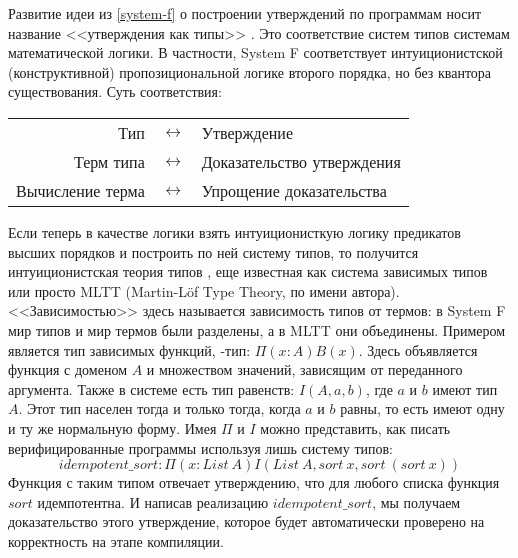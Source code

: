 Развитие идеи из \ref{system-f} о построении утверждений по программам носит
название <<утверждения как типы>> \cite{propositions-as-types}. Это соответствие
систем типов системам математической логики. В частности, System F
соответствует интуиционистской (конструктивной) пропозициональной логике второго
порядка, но без квантора существования. Суть соответствия:

\begin{tabular}{rcl}
  Тип & \(\leftrightarrow\) & Утверждение\\
  Терм типа & \(\leftrightarrow\) & Доказательство утверждения\\
  Вычисление терма & \(\leftrightarrow\) & Упрощение доказательства
\end{tabular}

Если теперь в качестве логики взять интуиционисткую логику предикатов высших
порядков и построить по ней систему типов, то получится интуиционистская
теория типов \cite{intuitionistic-theory-of-types}, еще известная как система
зависимых типов  или просто MLTT (Martin-L\"of Type Theory, по имени автора).
<<Зависимостью>> здесь называется зависимость типов от термов:
в System F мир типов и мир термов были разделены, а в MLTT они объединены.
Примером является тип зависимых функций, \textPi-тип: \(\Pi(x : A)B(x)\).
Здесь объявляется функция с доменом \(A\) и множеством значений, зависящим от
переданного аргумента. Также в системе есть тип равенств: \(I(A, a, b)\), где \(a\) и
\(b\) имеют тип \(A\). Этот тип населен тогда и только тогда, когда \(a\) и \(b\)
равны, то есть имеют одну и ту же нормальную форму. Имея \(\Pi\) и \(I\) можно
представить, как писать верифицированные программы используя лишь систему типов:
\[
  idempotent\_sort : \Pi(x : List\ A) I(List\ A, sort\ x, sort\ (sort\ x))
\]
Функция с таким типом отвечает утверждению, что для любого списка функция \(sort\)
идемпотентна. И написав реализацию \(idempotent\_sort\), мы получаем доказательство
этого утверждение, которое будет автоматически проверено на корректность на этапе
компиляции.
